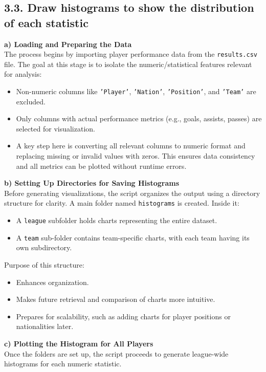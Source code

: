 \documentclass[a4paper,12pt]{article}
\begin{document}
\subsection*{\textbf{\Large 3.3. Draw histograms to show the distribution of each statistic}}
\textbf{a) Loading and Preparing the Data} \\
The process begins by importing player performance data from the \texttt{results.csv} file. The goal at this stage is to isolate the numeric/statistical features relevant for analysis:
\begin{itemize}
    \item Non-numeric columns like \texttt{'Player'}, \texttt{'Nation'}, \texttt{'Position'}, and \texttt{'Team'} are excluded.
    \item Only columns with actual performance metrics (e.g., goals, assists, passes) are selected for visualization.
    \item A key step here is converting all relevant columns to numeric format and replacing missing or invalid values with zeros. This ensures data consistency and all metrics can be plotted without runtime errors.
\end{itemize}

\textbf{b)  Setting Up Directories for Saving Histograms} \\
Before generating visualizations, the script organizes the output using a directory structure for clarity. A main folder named \texttt{histograms} is created. Inside it:
\begin{itemize}
    \item A \texttt{league} subfolder holds charts representing the entire dataset.
    \item A \texttt{team} sub-folder contains team-specific charts, with each team having its own subdirectory.
\end{itemize}

Purpose of this structure:
\begin{itemize}
    \item Enhances organization.
    \item Makes future retrieval and comparison of charts more intuitive.
    \item Prepares for scalability, such as adding charts for player positions or nationalities later.
\end{itemize}

\textbf{c) Plotting the Histogram for All Players} \\
Once the folders are set up, the script proceeds to generate league-wide histograms for each numeric statistic.
\end{document}
